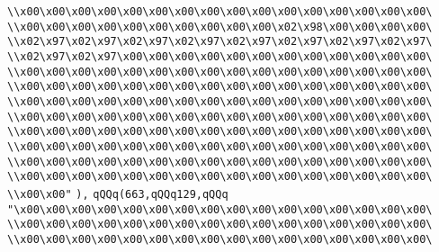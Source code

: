 \verb|\\x00\x00\x00\x00\x00\x00\x00\x00\x00\x00\x00\x00\x00\x00\x00\x00\|\newline
\verb|\\x00\x00\x00\x00\x00\x00\x00\x00\x00\x00\x02\x98\x00\x00\x00\x00\|\newline
\verb|\\x02\x97\x02\x97\x02\x97\x02\x97\x02\x97\x02\x97\x02\x97\x02\x97\|\newline
\verb|\\x02\x97\x02\x97\x00\x00\x00\x00\x00\x00\x00\x00\x00\x00\x00\x00\|\newline
\verb|\\x00\x00\x00\x00\x00\x00\x00\x00\x00\x00\x00\x00\x00\x00\x00\x00\|\newline
\verb|\\x00\x00\x00\x00\x00\x00\x00\x00\x00\x00\x00\x00\x00\x00\x00\x00\|\newline
\verb|\\x00\x00\x00\x00\x00\x00\x00\x00\x00\x00\x00\x00\x00\x00\x00\x00\|\newline
\verb|\\x00\x00\x00\x00\x00\x00\x00\x00\x00\x00\x00\x00\x00\x00\x00\x00\|\newline
\verb|\\x00\x00\x00\x00\x00\x00\x00\x00\x00\x00\x00\x00\x00\x00\x00\x00\|\newline
\verb|\\x00\x00\x00\x00\x00\x00\x00\x00\x00\x00\x00\x00\x00\x00\x00\x00\|\newline
\verb|\\x00\x00\x00\x00\x00\x00\x00\x00\x00\x00\x00\x00\x00\x00\x00\x00\|\newline
\verb|\\x00\x00\x00\x00\x00\x00\x00\x00\x00\x00\x00\x00\x00\x00\x00\x00\|\newline
\verb|\\x00\x00"|\newline
\verb|),|\newline
\verb|qQQq(663,qQQq129,qQQq|\newline
\verb|"\x00\x00\x00\x00\x00\x00\x00\x00\x00\x00\x00\x00\x00\x00\x00\x00\|\newline
\verb|\\x00\x00\x00\x00\x00\x00\x00\x00\x00\x00\x00\x00\x00\x00\x00\x00\|\newline
\verb|\\x00\x00\x00\x00\x00\x00\x00\x00\x00\x00\x00\x00\x00\x00\x00\x00\|\newline
